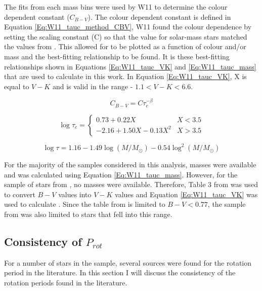 The fits from each mass bins were used by W11 to determine the colour dependent constant ($C_{B-V}$). The colour dependent constant is defined in Equation \ref{Eq:W11_tauc_method_CBV}, W11 found the colour dependence by setting the scaling constant (C) so that the \tauc value for solar-mass stars matched the values from \citet{Noyes_etal_1984}. This allowed for \tauc to be plotted as a function of colour and/or mass and the best-fitting relationship to be found. It is these best-fitting relationships shown in Equations \ref{Eq:W11_tauc_VK} and \ref{Eq:W11_tauc_mass} that are used to calculate \tauc in this work. In Equation \ref{Eq:W11_tauc_VK}, X is equal to $V-K$ and is valid in the range - $1.1 < V-K < 6.6$.

\begin{equation}
    C_{B-V} = C\tau_{c}^{-\beta}
    \label{Eq:W11_tauc_method_CBV}
\end{equation}

\begin{equation}
    \log \tau_{c} = 
    \begin{cases}
        0.73 + 0.22X & X < 3.5 \\
        -2.16 +1.50X - 0.13X^{2} & X > 3.5
    \end{cases}
    \label{Eq:W11_tauc_VK}
\end{equation}

\begin{equation}
    \log \tau = 1.16 - 1.49\log(M/M_{\odot}) - 0.54\log^{2}(M/M_{\odot})
    \label{Eq:W11_tauc_mass}
\end{equation}

For the majority of the samples considered in this analysis, masses were available and \tauc was calculated using Equation \ref{Eq:W11_tauc_mass}. However, for the sample of stars from \citet{Baliunas_etal_1996}, no masses were available. Therefore, Table 3 from \citet{Pecaut_etal_2012} was used to convert $B-V$ values into $V-K$ values and Equation \ref{Eq:W11_tauc_VK} was used to calculate \tauc. Since the table from \citet{Pecaut_etal_2012} is limited to $B-V < 0.77$, the sample from \citet{Baliunas_etal_1996} was also limited to stars that fell into this range.

\subsection{Consistency of \texorpdfstring{$P_{rot}$}{Prot}}
For a number of stars in the sample, several sources were found for the rotation period in the literature. In this section I will discuss the consistency of the rotation periods found in the literature.

